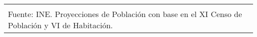 {\begin{center}
\begin{tabular}{lrrrrrrrr}
			\hline
			&&&&&&&&\\[-0.28cm]
			\multicolumn{9}{l}{\footnotesize Fuente:  INE. Proyecciones de Población con base en el XI Censo de Población y VI de Habitación.}
		\end{tabular}\addtocounter{Cuadro}{1}
	\end{center}}


